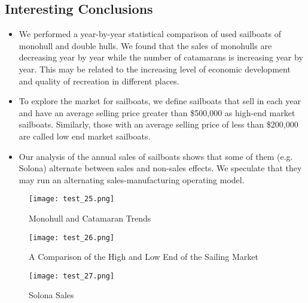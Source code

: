 \subsection{Interesting Conclusions}
\begin{itemize}
    \setlength{\parsep}{0ex} %
    \setlength{\topsep}{2ex} %
    \setlength{\itemsep}{1ex} %
    \item We performed a year-by-year statistical comparison of used sailboats of monohull and double hulls. We found that the sales of monohulls are decreasing year by year while the number of catamarans is increasing year by year. This may be related to the increasing level of economic development and quality of recreation in different places.
    \item To explore the market for sailboats, we define sailboats that sell in each year and have an average selling price greater than \$500,000 as high-end market sailboats. Similarly, those with an average selling price of less than \$200,000 are called low end market sailboats.
    \item Our analysis of the annual sales of sailboats shows that some of them (e.g. Solona) alternate between sales and non-sales effects. We speculate that they may run an alternating sales-manufacturing operating model.
\end{itemize}

\begin{figure}[H] %
	\centering
		\begin{minipage}[t]{0.3\linewidth} %
			\centering
			\texttt{[image: test\_25.png]}
            \captionsetup{justification=centering} \caption{Monohull and Catamaran Trends}
		\end{minipage}%
		\begin{minipage}[t]{0.3\linewidth}
			\centering
			\texttt{[image: test\_26.png]}
			\captionsetup{justification=centering} \caption{A Comparison of the High and Low End of the Sailing Market}
		\end{minipage}%
        \begin{minipage}[t]{0.3\linewidth}
			\centering
			\texttt{[image: test\_27.png]}
			\captionsetup{justification=centering} \caption{ Solona Sales}
		\end{minipage}%
    \vspace{-0.5cm}
\end{figure}



